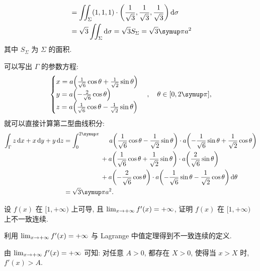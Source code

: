 \begin{exercise}[series=exer]
\begin{answer}
\begin{method}
\begin{align*}
          & = \iint_{\Sigma} (1, 1, 1) \cdot \qty(\frac{1}{\sqrt{3}}, \frac{1}{\sqrt{3}}, \frac{1}{\sqrt{3}}) \dd{\sigma} \\
          &  = \sqrt{3} \iint_{\Sigma} \dd{\sigma} = \sqrt{3} S_{\Sigma} = \sqrt{3} \pi a^{2} 
        \end{align*}
        其中 $ S_{\Sigma} $ 为 $ \Sigma $ 的面积.
      \item 可以写出 $ \Gamma $ 的参数方程:
        \begin{align*}
          \begin{cases}
            x = a\qty(\frac{1}{\sqrt{6}}\cos \theta + \frac{1}{\sqrt{2}}\sin \theta)\\
            y = a\qty(-\frac{2}{\sqrt{6}}\cos \theta)\\
            z = a\qty(\frac{1}{\sqrt{6}}\cos \theta - \frac{1}{\sqrt{2}}\sin \theta)
          \end{cases}, \quad \theta\in [0, 2\pi],
        \end{align*}
        就可以直接计算第二型曲线积分:
        \begin{align*}
          \int_{\Gamma} z \dx* + x \dy* + y \dz* 
          & = \int_{0}^{2\pi} 
            \begin{aligned}[t]
              & \mathrel{\phantom{+}}a\qty(\frac{1}{\sqrt{6}}\cos \theta - \frac{1}{\sqrt{2}}\sin \theta) \cdot a \qty(-\frac{1}{\sqrt{6}}\sin\theta + \frac{1}{\sqrt{2}}\cos\theta) \\
              & + a\qty(\frac{1}{\sqrt{6}}\cos \theta + \frac{1}{\sqrt{2}}\sin \theta) \cdot a \qty(\frac{2}{\sqrt{6}}\sin\theta) \\
              & + a\qty(-\frac{2}{\sqrt{6}}\cos \theta) \cdot a \qty(-\frac{1}{\sqrt{6}}\sin\theta - \frac{1}{\sqrt{2}}\cos\theta) \dd{\theta}
            \end{aligned} \\
          & = \sqrt{3} \pi a^{2}.
        \end{align*}
    \end{method}
  \end{answer}
  \item 设 $ f(x) $ 在 $ [1, +\infty) $ 上可导, 且 $ \lim_{x \to +\infty}f'(x) = +\infty $, 证明 $ f(x) $ 在 $ [1, +\infty) $ 上不一致连续.
  \begin{hint}
      利用 $ \lim_{x \to +\infty}f'(x) = +\infty $ 与 Lagrange 中值定理得到不一致连续的定义.
  \end{hint}
  \begin{answer}
    由 $ \lim_{x \to +\infty} f'(x) = +\infty $ 可知: 对任意 $ A > 0 $, 都存在 $ X > 0 $, 使得当 $ x > X $ 时, $ f'(x) > A $. 
    

\end{answer}
\end{exercise}
